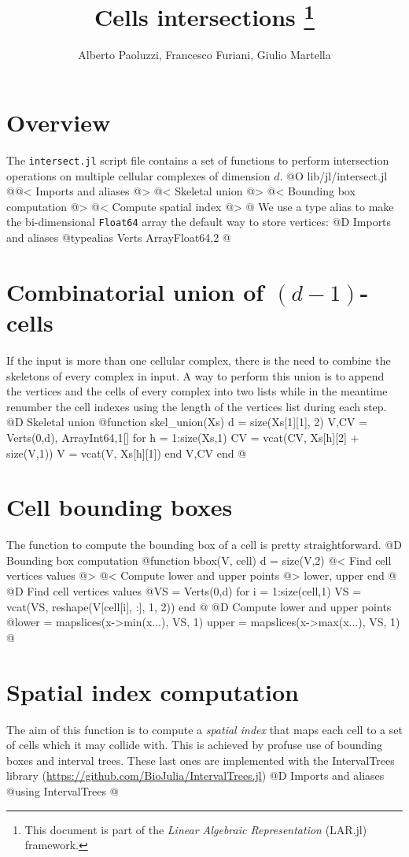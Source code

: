 \documentclass[10pt,oneside]{article}
\author{Alberto Paoluzzi, Francesco Furiani, Giulio Martella}
\title{Cells intersections
\footnote{This document is part of the \emph{Linear Algebraic Representation} (LAR.jl) framework.}
}
\begin{document}
\maketitle
\newpage

\section{Overview}
The \texttt{intersect.jl} script file contains a set of functions to perform intersection
operations on multiple cellular complexes of dimension $d$.
@O lib/jl/intersect.jl
@{@< Imports and aliases @>
@< Skeletal union @>
@< Bounding box computation @>
@< Compute spatial index @>
@}
We use a type alias to make the bi-dimensional \texttt{Float64} array 
the default way to store vertices:
@D Imports and aliases
@{typealias Verts Array{Float64,2}
@}

\section{Combinatorial union of $(d-1)$-cells}
If the input is more than one cellular complex, there is the need to combine 
the skeletons of every complex in input. A way to perform this union is to append
the vertices and the cells of every complex into two lists while in the meantime 
renumber the cell indexes using the length of the vertices list during each step.
@D Skeletal union
@{function skel_union(Xs)
    d = size(Xs[1][1], 2)
    V,CV = Verts(0,d), Array{Int64,1}[]
    for h = 1:size(Xs,1)
        CV = vcat(CV, Xs[h][2] + size(V,1))
        V = vcat(V, Xs[h][1])
    end
    V,CV
end
@}

\section{Cell bounding boxes}
The function to compute the bounding box of a cell
is pretty straightforward.
@D Bounding box computation
@{function bbox(V, cell)
    d = size(V,2)
    @< Find cell vertices values @>
    @< Compute lower and upper points @>
    lower, upper
end
@}
@D Find cell vertices values
@{VS = Verts(0,d)
for i = 1:size(cell,1)
    VS = vcat(VS, reshape(V[cell[i], :], 1, 2))
end
@}
@D Compute lower and upper points
@{lower = mapslices(x->min(x...), VS, 1)
upper = mapslices(x->max(x...), VS, 1)
@}

\section{Spatial index computation}
The aim of this function is to compute a \textit{spatial index} that maps
each cell to a set of cells which it may collide with.
This is achieved by profuse use of bounding boxes and interval trees. 
These last ones are implemented with the IntervalTrees library
(\url{https://github.com/BioJulia/IntervalTrees.jl})
@D Imports and aliases
@{using IntervalTrees
@}
\end{document}
